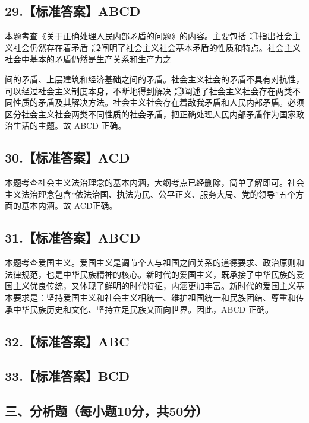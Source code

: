 \documentclass[UTF8,11pt]{ctexart}
\begin{document}
\subsection*{29.【标准答案】ABCD}

本题考查《关于正确处理人民内部矛盾的问题》的内容。主要包括：\textcircled{1}指出社会主义社会仍然存在着矛盾；\textcircled{2}阐明了社会主义社会基本矛盾的性质和特点。社会主义社会中基本的矛盾仍然是生产关系和生产力之


间的矛盾、上层建筑和经济基础之间的矛盾。社会主义社会的矛盾不具有对抗性，可以经过社会主义制度本身，不断地得到解决；\textcircled{3}阐述了社会主义社会存在两类不同性质的矛盾及其解决方法。社会主义社会存在着敌我矛盾和人民内部矛盾。必须区分社会主义社会两类不同性质的社会矛盾，把正确处理人民内部矛盾作为国家政治生活的主题。故 ABCD 正确。


\subsection*{30.【标准答案】ACD}

本题考查社会主义法治理念的基本内涵，大纲考点已经删除，简单了解即可。社会主义法治理念包含“依法治国、执法为民、公平正义、服务大局、党的领导”五个方面的基本内涵。故 ACD正确。


\subsection*{31.【标准答案】ABCD}

本题考查爱国主义。爱国主义是调节个人与祖国之间关系的道德要求、政治原则和法律规范，也是中华民族精神的核心。新时代的爱国主义，既承接了中华民族的爱国主义优良传统，又体现了鲜明的时代特征，内涵更加丰富。新时代的爱国主义基本要求是：坚持爱国主义和社会主义相统一、维护祖国统一和民族团结、尊重和传承中华民族历史和文化、坚持立足民族又面向世界。因此，ABCD 正确。


\subsection*{32.【标准答案】ABC}

\subsection*{33.【标准答案】BCD}

\subsection*{三、分析题（每小题10分，共50分）}
\end{document}
